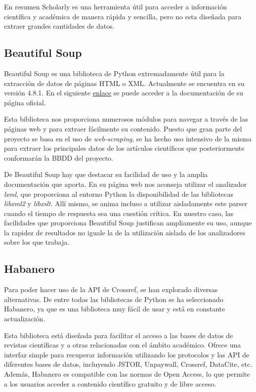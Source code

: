 En resumen Scholarly es una herramienta útil para acceder a información científica y académica de manera rápida y sencilla, pero no esta diseñada para extraer grandes cantidades de datos.

\subsection{Beautiful Soup}
Beautiful Soup es una biblioteca de Python extremadamente útil para la extracción de datos de páginas HTML o XML. Actualmente se encuentra en su versión 4.8.1. En el siguiente \href{https://beautiful-soup-4.readthedocs.io/en/latest/}{enlace} se puede acceder a la documentación de su página oficial. 

Esta biblioteca nos proporciona numerosos módulos para navegar a través de las páginas web y para extraer fácilmente su contenido. Puesto que gran parte del proyecto se basa en el uso de \textit{web-scraping}, se ha hecho uso intensivo de la misma para extraer los principales datos de los artículos científicos que posteriormente conformarán la BBDD del proyecto.

De Beautiful Soup hay que destacar su facilidad de uso y la amplia documentación que aporta. En su página web nos aconseja utilizar el analizador \textit{lxml}, que proporciona al entorno Python la disponibilidad de las bibliotecas \textit{libxml2} y \textit{libxslt}. Allí mismo, se anima incluso a utilizar aisladamente este parser cuando el tiempo de respuesta sea una cuestión crítica. En nuestro caso, las facilidades que proporciona Beautiful Soup justifican ampliamente su uso, aunque la  rapidez de resultados no iguale la de la utilización aislada de los analizadores sobre los que trabaja.
 

\subsection{Habanero}
Para poder hacer uso de la API de Crossref, se han explorado diversas alternativas. De entre todas las bibliotecas de Python se ha seleccionado Habanero, ya que es una biblioteca muy fácil de usar y está en constante actualización.

Esta biblioteca está diseñada para facilitar el acceso a las bases de datos de revistas científicas y a otras relacionadas con el ámbito académico. Ofrece una interfaz simple para recuperar información utilizando los protocolos y las API de diferentes bases de datos, incluyendo JSTOR, Unpaywall, Crossref, DataCite, etc. Además, Habanero es compatible con las normas de Open Access, lo que permite a los usuarios acceder a contenido científico gratuito y de libre acceso.

